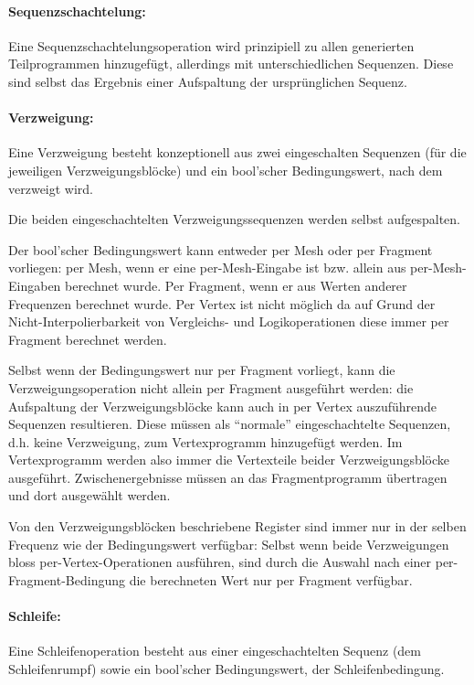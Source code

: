 \documentclass[twoside,a4paper,fleqn,12pt]{book}
\begin{document}
\paragraph{Sequenzschachtelung:} Eine Sequenzschachtelungsoperation wird prinzipiell zu allen generierten Teilprogrammen hinzugefügt,
allerdings mit unterschiedlichen Sequenzen. Diese sind selbst das Ergebnis einer Aufspaltung der ursprünglichen Sequenz.

\paragraph{Verzweigung:} Eine Verzweigung besteht konzeptionell aus zwei eingeschalten Sequenzen (für die jeweiligen Verzweigungsblöcke)
und ein bool'scher Bedingungswert, nach dem verzweigt wird.

Die beiden eingeschachtelten Verzweigungssequenzen werden selbst aufgespalten.

Der bool'scher Bedingungswert kann entweder per Mesh oder per Fragment vorliegen: per Mesh, wenn er eine per-Mesh-Eingabe ist bzw. allein aus
per-Mesh-Eingaben berechnet wurde. Per Fragment, wenn er aus Werten anderer Frequenzen berechnet wurde. Per Vertex ist nicht
möglich da auf Grund der Nicht-Interpolierbarkeit von Vergleichs- und Logikoperationen diese immer per Fragment berechnet werden.

Selbst wenn der Bedingungswert nur per Fragment vorliegt, kann die Verzweigungsoperation nicht allein per Fragment ausgeführt werden:
die Aufspaltung der Verzweigungsblöcke kann auch in per Vertex auszuführende Sequenzen resultieren. Diese müssen als "`normale"'
eingeschachtelte Sequenzen, d.h. keine Verzweigung, zum Vertexprogramm hinzugefügt werden. Im Vertexprogramm werden also immer
die Vertexteile beider Verzweigungsblöcke ausgeführt. Zwischenergebnisse müssen an das Fragmentprogramm übertragen und dort ausgewählt werden.

Von den Verzweigungsblöcken beschriebene Register sind immer nur in der selben Frequenz wie der Bedingungswert verfügbar:
Selbst wenn beide Verzweigungen bloss per-Vertex-Operationen ausführen, sind durch die Auswahl nach einer per-Fragment-Bedingung
die berechneten Wert nur per Fragment verfügbar.

\paragraph{Schleife:} Eine Schleifenoperation besteht aus einer eingeschachtelten Sequenz (dem Schleifenrumpf) sowie
ein bool'scher Bedingungswert, der Schleifenbedingung.
\end{document}
